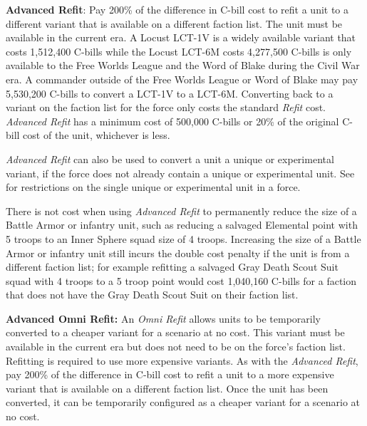 \item {\bfseries Advanced Refit}: Pay 200\% of the difference in C-bill cost to refit a unit to a different variant that is available on a different faction list.
The unit must be available in the current era.
A Locust LCT-1V is a widely available variant that costs 1,512,400 C-bills while the Locust LCT-6M costs 4,277,500 C-bills is only available to the Free Worlds League and the Word of Blake during the Civil War era.
A commander outside of the Free Worlds League or Word of Blake may pay 5,530,200 C-bills to convert a LCT-1V to a LCT-6M.
Converting back to a variant on the faction list for the force only costs the standard \emph{Refit} cost.
\emph{Advanced Refit} has a minimum cost of 500,000 C-bills or 20\% of the original C-bill cost of the unit, whichever is less.

\emph{Advanced Refit} can also be used to convert a unit a unique or experimental variant, if the force does not already contain a unique or experimental unit.
See  for restrictions on the single unique or experimental unit in a force.

There is not cost when using \emph{Advanced Refit} to permanently reduce the size of a Battle Armor or infantry unit, such as reducing a salvaged Elemental point with 5 troops to an Inner Sphere squad size of 4 troops.
Increasing the size of a Battle Armor or infantry unit still incurs the double cost penalty if the unit is from a different faction list; for example refitting a salvaged Gray Death Scout Suit squad with 4 troops to a 5 troop point would cost 1,040,160 C-bills for a faction that does not have the Gray Death Scout Suit on their faction list.

\item {\bfseries Advanced Omni Refit:} An \emph{Omni Refit} allows units to be temporarily converted to a cheaper variant for a scenario at no cost.
This variant must be available in the current era but does not need to be on the force's faction list.
Refitting is required to use more expensive variants.
As with the \emph{Advanced Refit}, pay 200\% of the difference in C-bill cost to refit a unit to a more expensive variant that is available on a different faction list.
Once the unit has been converted, it can be temporarily configured as a cheaper variant for a scenario at no cost.
